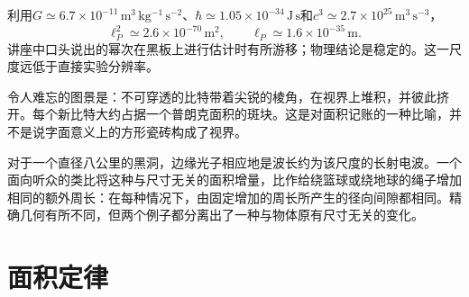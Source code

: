 利用\(G\simeq6.7\times10^{-11}\,\mathrm{m^3\,kg^{-1}\,s^{-2}}\)、\(\hbar\simeq1.05\times10^{-34}\,\mathrm{J\,s}\)和\(c^3\simeq2.7\times10^{25}\,\mathrm{m^3\,s^{-3}}\)，
\begin{equation}
\ell_P^2\simeq2.6\times10^{-70}\,\mathrm{m^2},
\qquad
\ell_P\simeq1.6\times10^{-35}\,\mathrm{m}.
\end{equation}
讲座中口头说出的幂次在黑板上进行估计时有所游移；物理结论是稳定的。这一尺度远低于直接实验分辨率。

令人难忘的图景是：不可穿透的比特带着尖锐的棱角，在视界上堆积，并彼此挤开。每个新比特大约占据一个普朗克面积的斑块。这是对面积记账的一种比喻，并不是说字面意义上的方形瓷砖构成了视界。

\begin{classroomqa}
\end{classroomqa}

\begin{classroomqa}
\end{classroomqa}

\begin{classroomqa}
\end{classroomqa}

对于一个直径八公里的黑洞，边缘光子相应地是波长约为该尺度的长射电波。一个面向听众的类比将这种与尺寸无关的面积增量，比作给绕篮球或绕地球的绳子增加相同的额外周长：在每种情况下，由固定增加的周长所产生的径向间隙都相同。精确几何有所不同，但两个例子都分离出了一种与物体原有尺寸无关的变化。

\section{面积定律}

